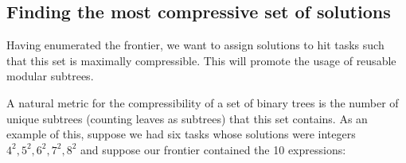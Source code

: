 \documentclass{article}
\begin{document}
\subsection{Finding the most compressive set of solutions}

Having enumerated the frontier, we want to assign solutions
to hit tasks such that this set is maximally compressible. This will
promote the usage of reusable modular subtrees. 

A natural metric for the compressibility of a set of binary trees is
the number of unique subtrees (counting leaves as subtrees) that this
set contains. As an example of this, suppose we had six tasks whose
solutions were integers $4^2, 5^2, 6^2, 7^2, 8^2$ and suppose our
frontier contained the 10 expressions:

\captionsetup[subfigure]{labelformat=empty} 
\end{document}
